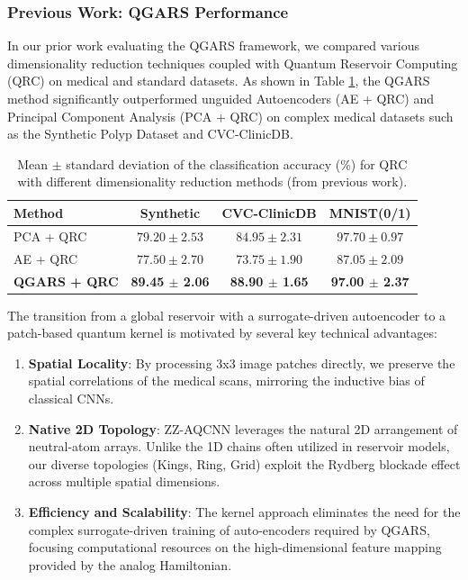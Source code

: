 \documentclass{oqireport}
\begin{document}
\subsubsection{Previous Work: QGARS Performance}
In our prior work evaluating the QGARS framework, we compared various dimensionality reduction techniques coupled with Quantum Reservoir Computing (QRC) on medical and standard datasets. As shown in Table \ref{tab:qrc_reduction_accuracy}, the QGARS method significantly outperformed unguided Autoencoders (AE + QRC) and Principal Component Analysis (PCA + QRC) on complex medical datasets such as the Synthetic Polyp Dataset and CVC-ClinicDB.

\begin{table}[htbp]
  \caption{Mean $\pm$ standard deviation of the classification accuracy (\%) for QRC with different dimensionality reduction methods (from previous work).}
  \centering
  \label{tab:qrc_reduction_accuracy}
  \begin{tabular}{lccc}
    \toprule
    Method         & Synthetic  & CVC-ClinicDB & MNIST(0/1) \\
    \midrule
    PCA + QRC      &  $79.20 \pm 2.53$  &  $84.95 \pm 2.31$   &  $97.70 \pm 0.97$ \\
    AE + QRC       &  $77.50 \pm 2.70$  & $73.75 \pm 1.90$   &  $87.05 \pm 2.09$ \\
    \textbf{QGARS + QRC}    &  \textbf{89.45 $\pm$ 2.06} &  \textbf{88.90 $\pm$ 1.65} &  \textbf{97.00 $\pm$ 2.37} \\
    \bottomrule
  \end{tabular}
\end{table}

The transition from a global reservoir with a surrogate-driven autoencoder to a patch-based quantum kernel is motivated by several key technical advantages:
\begin{enumerate}
    \item \textbf{Spatial Locality}: By processing 3x3 image patches directly, we preserve the spatial correlations of the medical scans, mirroring the inductive bias of classical CNNs.
    \item \textbf{Native 2D Topology}: ZZ-AQCNN leverages the natural 2D arrangement of neutral-atom arrays. Unlike the 1D chains often utilized in reservoir models, our diverse topologies (Kings, Ring, Grid) exploit the Rydberg blockade effect across multiple spatial dimensions.
    \item \textbf{Efficiency and Scalability}: The kernel approach eliminates the need for the complex surrogate-driven training of auto-encoders required by QGARS, focusing computational resources on the high-dimensional feature mapping provided by the analog Hamiltonian.
\end{enumerate}
\end{document}
